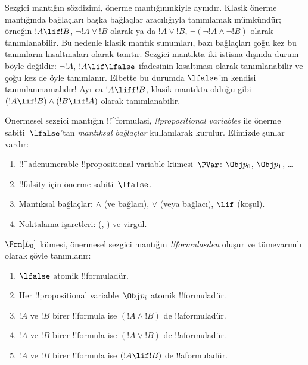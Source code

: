 \documentclass[../../../include/open-logic-section]{subfiles}
\begin{document}


Sezgici mantığın sözdizimi, önerme mantığınınkiyle aynıdır. Klasik önerme
mantığında bağlaçları başka bağlaçlar aracılığıyla tanımlamak mümkündür;
örneğin $!A \lif !B$, $\lnot !A \lor !B$ olarak ya da $!A \lor !B$,
$\lnot(\lnot !A \land \lnot !B)$ olarak tanımlanabilir. Bu nedenle klasik
mantık sunumları, bazı bağlaçları çoğu kez bu tanımların kısaltmaları olarak
tanıtır. Sezgici mantıkta iki istisna dışında durum böyle değildir: $\lnot !A$,
$!A \lif \lfalse$ ifadesinin kısaltması olarak tanımlanabilir ve çoğu kez de
öyle tanımlanır. Elbette bu durumda $\lfalse$'ın kendisi tanımlanmamalıdır!{}
Ayrıca $!A \liff !B$, klasik mantıkta olduğu gibi $(!A \lif !B) \land (!B
\lif !A)$ olarak tanımlanabilir.

Önermesel sezgici mantığın !!^{formula}s{}i, \emph{!!{propositional variable}s}
ile önerme sabiti~$\lfalse$'tan \emph{mantıksal bağlaçlar} kullanılarak
kurulur. Elimizde şunlar vardır:

\begin{enumerate}
\item !!^a{denumerable} !!{propositional variable} kümesi~$\PVar$: $\Obj p_0$,
  $\Obj p_1$, \dots
\item !!{falsity} için önerme sabiti~$\lfalse$.
\item Mantıksal bağlaçlar: $\land$ (ve bağlacı), $\lor$ (veya bağlacı),
  $\lif$ (koşul).
\item Noktalama işaretleri: (, ) ve virgül.
\end{enumerate}

\begin{defn}[Formül]
 $\Frm[L_0]$ kümesi, önermesel sezgici mantığın
\emph{!!{formula}s{}den} oluşur ve tümevarımlı olarak şöyle tanımlanır:
\begin{enumerate}
\item $\lfalse$ atomik !!{formula}{}dür.

\item Her !!{propositional variable}~$\Obj p_i$ atomik !!{formula}{}dür.

\item $!A$ ve $!B$ birer !!{formula} ise $(!A \land !B)$ de
  !!a{formula}{}dür.

\item $!A$ ve $!B$ birer !!{formula} ise $(!A \lor !B)$ de
  !!a{formula}{}dür.

\item $!A$ ve $!B$ birer !!{formula} ise $(!A \lif !B)$ de
  !!a{formula}{}dür.

\end{enumerate}
\end{defn}
\end{document}
